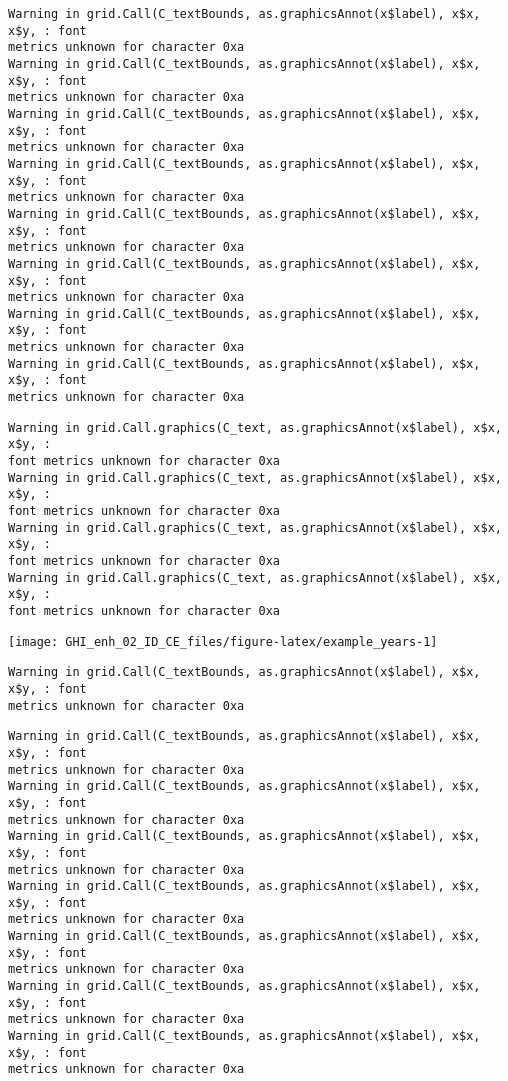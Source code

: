 \documentclass[
  10pt,
  a4paper,oneside]{article}
\begin{document}
\begin{verbatim}
Warning in grid.Call(C_textBounds, as.graphicsAnnot(x$label), x$x, x$y, : font
metrics unknown for character 0xa
Warning in grid.Call(C_textBounds, as.graphicsAnnot(x$label), x$x, x$y, : font
metrics unknown for character 0xa
Warning in grid.Call(C_textBounds, as.graphicsAnnot(x$label), x$x, x$y, : font
metrics unknown for character 0xa
Warning in grid.Call(C_textBounds, as.graphicsAnnot(x$label), x$x, x$y, : font
metrics unknown for character 0xa
Warning in grid.Call(C_textBounds, as.graphicsAnnot(x$label), x$x, x$y, : font
metrics unknown for character 0xa
Warning in grid.Call(C_textBounds, as.graphicsAnnot(x$label), x$x, x$y, : font
metrics unknown for character 0xa
Warning in grid.Call(C_textBounds, as.graphicsAnnot(x$label), x$x, x$y, : font
metrics unknown for character 0xa
Warning in grid.Call(C_textBounds, as.graphicsAnnot(x$label), x$x, x$y, : font
metrics unknown for character 0xa
\end{verbatim}

\begin{verbatim}
Warning in grid.Call.graphics(C_text, as.graphicsAnnot(x$label), x$x, x$y, :
font metrics unknown for character 0xa
Warning in grid.Call.graphics(C_text, as.graphicsAnnot(x$label), x$x, x$y, :
font metrics unknown for character 0xa
Warning in grid.Call.graphics(C_text, as.graphicsAnnot(x$label), x$x, x$y, :
font metrics unknown for character 0xa
Warning in grid.Call.graphics(C_text, as.graphicsAnnot(x$label), x$x, x$y, :
font metrics unknown for character 0xa
\end{verbatim}

\begin{center}\texttt{[image: GHI\_enh\_02\_ID\_CE\_files/figure-latex/example\_years-1]} \end{center}

\begin{verbatim}
Warning in grid.Call(C_textBounds, as.graphicsAnnot(x$label), x$x, x$y, : font
metrics unknown for character 0xa
\end{verbatim}

\begin{verbatim}
Warning in grid.Call(C_textBounds, as.graphicsAnnot(x$label), x$x, x$y, : font
metrics unknown for character 0xa
Warning in grid.Call(C_textBounds, as.graphicsAnnot(x$label), x$x, x$y, : font
metrics unknown for character 0xa
Warning in grid.Call(C_textBounds, as.graphicsAnnot(x$label), x$x, x$y, : font
metrics unknown for character 0xa
Warning in grid.Call(C_textBounds, as.graphicsAnnot(x$label), x$x, x$y, : font
metrics unknown for character 0xa
Warning in grid.Call(C_textBounds, as.graphicsAnnot(x$label), x$x, x$y, : font
metrics unknown for character 0xa
Warning in grid.Call(C_textBounds, as.graphicsAnnot(x$label), x$x, x$y, : font
metrics unknown for character 0xa
Warning in grid.Call(C_textBounds, as.graphicsAnnot(x$label), x$x, x$y, : font
metrics unknown for character 0xa
\end{verbatim}
\end{document}

